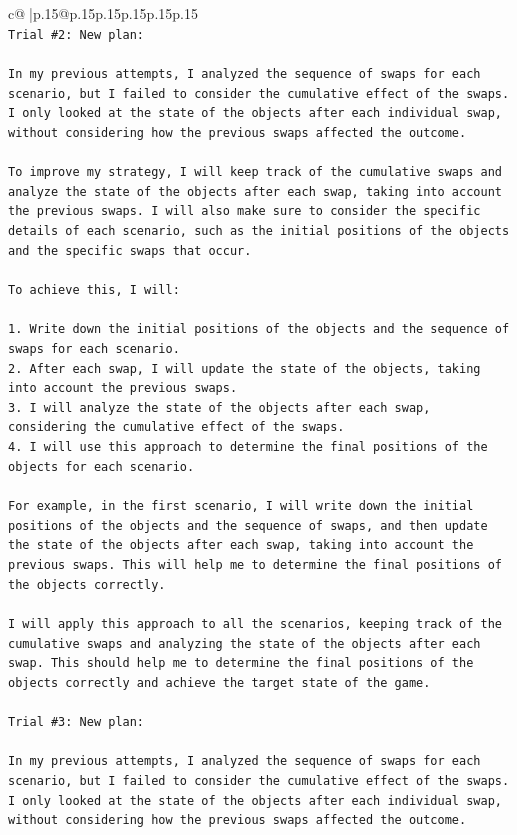 \documentclass{article}
\begin{document}
{\begin{supertabular}{c@{$\;$}|p{.15\linewidth}@{}p{.15\linewidth}p{.15\linewidth}p{.15\linewidth}p{.15\linewidth}p{.15\linewidth}}
{{{\\ 
\texttt{Trial \#2: New plan: } \\
\\ 
\texttt{In my previous attempts, I analyzed the sequence of swaps for each scenario, but I failed to consider the cumulative effect of the swaps. I only looked at the state of the objects after each individual swap, without considering how the previous swaps affected the outcome.} \\
\\ 
\texttt{To improve my strategy, I will keep track of the cumulative swaps and analyze the state of the objects after each swap, taking into account the previous swaps. I will also make sure to consider the specific details of each scenario, such as the initial positions of the objects and the specific swaps that occur.} \\
\\ 
\texttt{To achieve this, I will:} \\
\\ 
\texttt{1. Write down the initial positions of the objects and the sequence of swaps for each scenario.} \\
\texttt{2. After each swap, I will update the state of the objects, taking into account the previous swaps.} \\
\texttt{3. I will analyze the state of the objects after each swap, considering the cumulative effect of the swaps.} \\
\texttt{4. I will use this approach to determine the final positions of the objects for each scenario.} \\
\\ 
\texttt{For example, in the first scenario, I will write down the initial positions of the objects and the sequence of swaps, and then update the state of the objects after each swap, taking into account the previous swaps. This will help me to determine the final positions of the objects correctly.} \\
\\ 
\texttt{I will apply this approach to all the scenarios, keeping track of the cumulative swaps and analyzing the state of the objects after each swap. This should help me to determine the final positions of the objects correctly and achieve the target state of the game.} \\
\\ 
\texttt{Trial \#3: New plan: } \\
\\ 
\texttt{In my previous attempts, I analyzed the sequence of swaps for each scenario, but I failed to consider the cumulative effect of the swaps. I only looked at the state of the objects after each individual swap, without considering how the previous swaps affected the outcome.} \\
}}}
\end{supertabular}}
\end{document}
